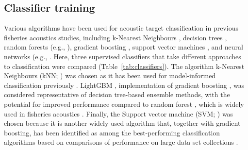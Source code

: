 \subsection{Classifier training}
Various algorithms have been used for acoustic target classification in previous fisheries acoustics studies, including k-Nearest Neighbours \citep{Cotter2021}, decision trees \citep{Fernandes2009, DElia2014}, random forests (e.g., \citealt{Gugele2021, Proud2020}), gradient boosting \citep{EscobarFlores2019}, support vector machines \citep{Roberts2011, Roa2022}, and neural networks (e.g., \citealt{Simmonds1996, Cabreira2009, Brautaset2020}. Here, three supervised classifiers that take different approaches to classification were compared (Table~\ref{tab:classifiers}). The algorithm k-Nearest Neighbours (kNN; \citealt{Goldberger2004}) was chosen as it has been used for model-informed classification previously \citep{Cotter2021}. LightGBM \citep{Ke2017}, implementation of gradient boosting \citep{Friedman2001}, was considered representative of decision tree-based ensemble methods, with the potential for improved performance compared to random forest \citep{FernandezDelgado2014}, which is widely used in fisheries acoustics \citep{Fernandes2009, Gugele2021}. Finally, the Support vector machine (SVM; \citealt{Cortes1995}) was chosen because it is another widely used algorithm that, together with gradient boosting, has been identified as among the best-performing classification algorithms based on comparisons of performance on large data set collections \citep{FernandezDelgado2014}.

